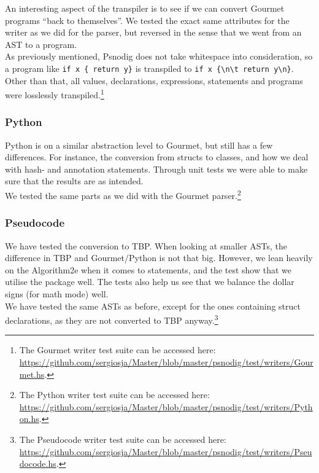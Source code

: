 An interesting aspect of the transpiler is to see if we can convert Gourmet programs ``back to themselves''. We tested the exact same attributes for the writer as we did for the parser, but reversed in the sense that we went from an AST to a program. \\

As previously mentioned, Psnodig does not take whitespace into consideration, so a program like \texttt{if x \{ return y\}} is transpiled to \texttt{if x \{\textbackslash n\textbackslash t return y\textbackslash n\}}. Other than that, all values, declarations, expressions, statements and programs were losslessly transpiled.\footnote{The Gourmet writer test suite can be accessed here: \url{https://github.com/sergiosja/Master/blob/master/psnodig/test/writers/Gourmet.hs}.}

\subsubsection{Python}

Python is on a similar abstraction level to Gourmet, but still has a few differences. For instance, the conversion from structs to classes, and how we deal with hash- and annotation statements. Through unit tests we were able to make sure that the results are as intended. \\

We tested the same parts as we did with the Gourmet parser.\footnote{The Python writer test suite can be accessed here: \url{https://github.com/sergiosja/Master/blob/master/psnodig/test/writers/Python.hs}.}

\subsubsection{Pseudocode}

We have tested the conversion to TBP. When looking at smaller ASTs, the difference in TBP and Gourmet/Python is not that big. However, we lean heavily on the Algorithm2e when it comes to statements, and the test show that we utilise the package well. The tests also help us see that we balance the dollar signs (for math mode) well. \\

We have tested the same ASTs as before, except for the ones containing struct declarations, as they are not converted to TBP anyway.\footnote{The Pseudocode writer test suite can be accessed here: \url{https://github.com/sergiosja/Master/blob/master/psnodig/test/writers/Pseudocode.hs}.}

